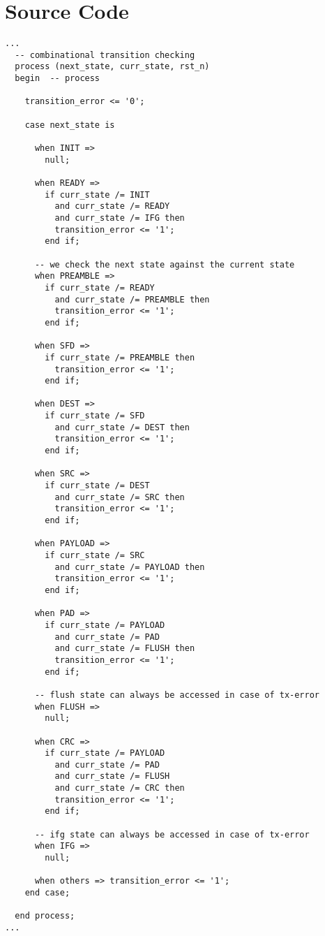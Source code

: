 ﻿\chapter{Source Code}
\label{chap:sourcecode}

\begin{center}
\lstset{language=VHDL}
\begin{lstlisting}[caption={Combinational part of the checker for state transition inspection},label={lst:appendix_trans_checker}]
...
  -- combinational transition checking
  process (next_state, curr_state, rst_n)
  begin  -- process

    transition_error <= '0';

    case next_state is

      when INIT =>
        null;
        
      when READY =>
        if curr_state /= INIT
          and curr_state /= READY
          and curr_state /= IFG then
          transition_error <= '1';
        end if;

      -- we check the next state against the current state
      when PREAMBLE =>
        if curr_state /= READY
          and curr_state /= PREAMBLE then
          transition_error <= '1';
        end if;

      when SFD =>
        if curr_state /= PREAMBLE then
          transition_error <= '1';
        end if;

      when DEST =>
        if curr_state /= SFD
          and curr_state /= DEST then
          transition_error <= '1';
        end if;

      when SRC =>
        if curr_state /= DEST
          and curr_state /= SRC then
          transition_error <= '1';
        end if;

      when PAYLOAD =>
        if curr_state /= SRC
          and curr_state /= PAYLOAD then
          transition_error <= '1';
        end if;

      when PAD =>
        if curr_state /= PAYLOAD
          and curr_state /= PAD
          and curr_state /= FLUSH then
          transition_error <= '1';
        end if;

      -- flush state can always be accessed in case of tx-error
      when FLUSH =>
        null;

      when CRC =>
        if curr_state /= PAYLOAD
          and curr_state /= PAD
          and curr_state /= FLUSH
          and curr_state /= CRC then
          transition_error <= '1';
        end if;

      -- ifg state can always be accessed in case of tx-error
      when IFG =>
        null;
        
      when others => transition_error <= '1';
    end case;
    
  end process;
...
\end{lstlisting}
\end{center}
